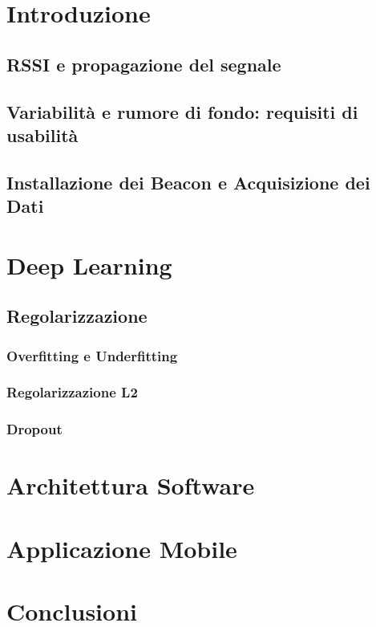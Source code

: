 \documentclass[12pt]{report}
\begin{document}
\begin{abstract}
  
\end{abstract}

\tableofcontents

\chapter{Introduzione}

\section{RSSI e propagazione del segnale}
\section{Variabilità e rumore di fondo: requisiti di usabilità}
\section{Installazione dei Beacon e Acquisizione dei Dati}

\chapter{Deep Learning}


\section{Regolarizzazione}
\subsection{Overfitting e Underfitting}
\subsection{Regolarizzazione L2}
\subsection{Dropout}

\chapter{Architettura Software}\label{cap:architecture}


\chapter{Applicazione Mobile}


\chapter{Conclusioni}


\appendix%



\printbibliography%
\end{document}
